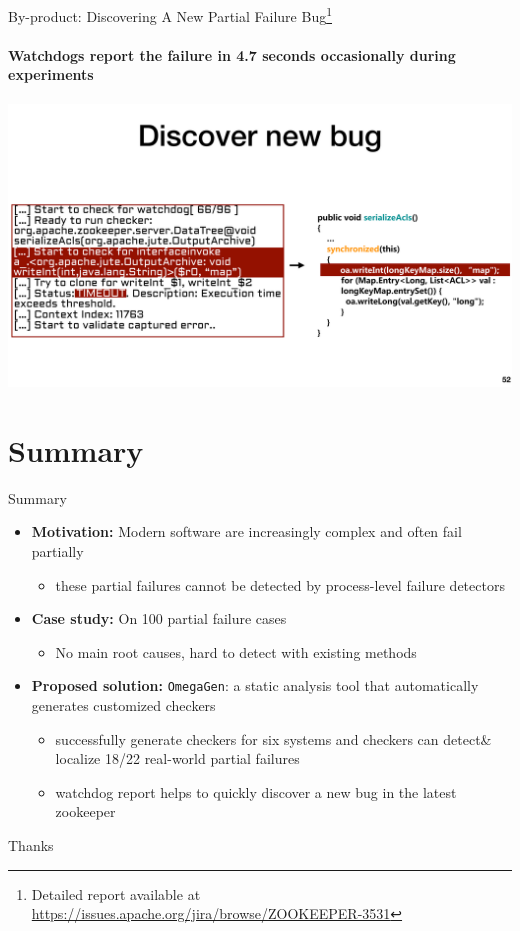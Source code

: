 \documentclass[aspectratio=169]{beamer}
\begin{document}
\begin{frame}{By-product: Discovering A New Partial Failure Bug\footnote{Detailed report available at \url{https://issues.apache.org/jira/browse/ZOOKEEPER-3531}}}
    \framesubtitle{Watchdogs report the failure in 4.7 seconds occasionally during experiments}

    \includegraphics[width=\textwidth]{fig/log}

\end{frame}


\section{Summary}

\begin{frame}{Summary}
    \begin{itemize}
        \item \textbf{Motivation:} Modern software are increasingly complex and often fail
        partially
        \begin{itemize}
            \item these partial failures cannot be detected by process-level failure detectors
        \end{itemize}

        \vspace{1em}

        \item \textbf{Case study:} On 100 partial failure cases
        \begin{itemize}
            \item No main root causes, hard to detect with existing methods
        \end{itemize}

        \vspace{1em}

        \item \textbf{Proposed solution:} \texttt{OmegaGen}: a static analysis tool that automatically generates customized checkers
        \begin{itemize}
            \item successfully generate checkers for six systems and checkers can detect\& localize 18/22 real-world partial failures
            \item watchdog report helps to quickly discover a new bug in the latest zookeeper
        \end{itemize}
    \end{itemize}
\end{frame}

\begin{frame}
    \centering
    \Huge{Thanks}
\end{frame}
\end{document}
